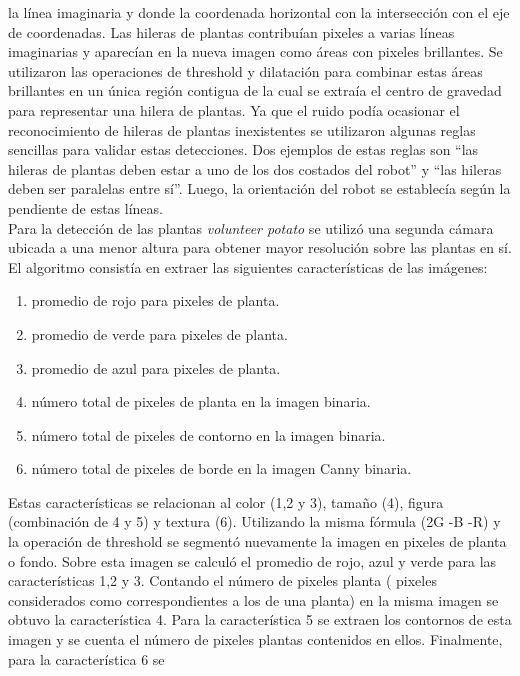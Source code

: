 	la l\'inea imaginaria y donde la coordenada horizontal con la 
	intersecci\'on con el eje de coordenadas. Las hileras de plantas 
	contribu\'ian pixeles a varias l\'ineas imaginarias y aparec\'ian en la 
	nueva imagen como \'areas con pixeles brillantes. Se utilizaron las 
	operaciones de threshold y dilataci\'on para combinar estas \'areas 
	brillantes en un \'unica regi\'on contigua de la cual se 
	extra\'ia el centro de gravedad para representar una hilera de 
	plantas. Ya que el ruido pod\'ia ocasionar el reconocimiento de 
	hileras de plantas inexistentes se utilizaron algunas reglas 
	sencillas para validar estas detecciones. Dos ejemplos de estas 
	reglas son ``las hileras de plantas deben estar a uno de los dos 
	costados del robot'' y ``las hileras deben ser paralelas entre s\'i''.
	Luego, la orientaci\'on del robot se establec\'ia seg\'un la pendiente de 
	estas l\'ineas.\\
	\indent Para la detecci\'on de las plantas \emph{volunteer potato} se 
	utiliz\'o una segunda c\'amara ubicada a una menor altura para obtener 
	mayor resoluci\'on sobre las plantas en s\'i. El algoritmo consist\'ia en 
	extraer las siguientes caracter\'isticas de las im\'agenes: 
	\begin{enumerate}
	\item{promedio de rojo para pixeles de planta.}
	\item{promedio de verde para 
	pixeles de planta.}
	\item{promedio de azul para pixeles de planta.}
	\item{n\'umero total de pixeles de planta en la imagen binaria.}
	\item{n\'umero total de pixeles de contorno en la imagen binaria.}
	\item{n\'umero total de pixeles de borde en la imagen Canny binaria.}
	\end{enumerate} Estas 
	caracter\'isticas se relacionan al color (1,2 y 3), tama\~no (4), figura 
	(combinaci\'on de 4 y 5) y textura (6).  Utilizando la misma f\'ormula 
	(2G -B -R) y la operaci\'on de threshold se segment\'o nuevamente la imagen 
	 en pixeles de planta o fondo. Sobre esta imagen se calcul\'o el 
	 promedio de rojo, azul y verde para las caracter\'isticas 1,2 y 3. 
	 Contando el n\'umero de pixeles planta ( pixeles considerados como 
	 correspondientes a los de una planta) en la misma 
	 imagen se obtuvo la caracter\'istica 4. Para la caracter\'istica 5 
	 se extraen los contornos de esta imagen y se cuenta el n\'umero de 
	 pixeles plantas contenidos en ellos. Finalmente, para la caracter\'istica 6 se 
